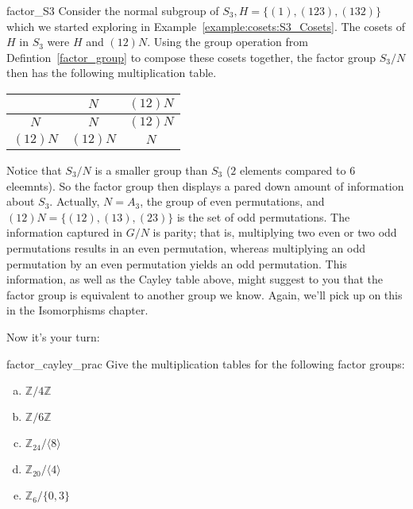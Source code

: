 { 
\begin{example}{factor_S3}
Consider the normal subgroup of $S_3, H = \{ (1), (123), (132)  \}$ which we started exploring in Example~\ref{example:cosets:S3_Cosets}.
The cosets of $H$ in $S_3$ were $H$ and $(12) N$. Using the group operation from Defintion~\ref{factor_group} to compose these cosets together, the factor group $S_3
/ N$ then has the following multiplication table.
\begin{center}
\begin{tabular}{c|cc}
         & $N$      & $(12) N$ \\
\hline
$N$      & $N$      & $(12) N$ \\
$(12) N$ & $(12) N$ & $N$
\end{tabular}
\end{center}

Notice that  $S_3 / N$ is a smaller group than $S_3$ ($2$ elements compared to $6$ eleemnts). So the factor group then displays a pared down amount of
information about $S_3$.  Actually, $N = A_3$, the group of even
permutations, and $(12) N = \{ (12), (13), (23) \}$ is the set of odd
permutations. The information captured in $G/N$ is parity; that is,
multiplying two even or two odd permutations results in an even
permutation, whereas multiplying an odd permutation by an even
permutation yields an odd permutation.  This information, as well as the Cayley table above, might suggest to you that the factor group is equivalent to another group we know.  Again, we'll pick up on this in the Isomorphisms chapter. 
\end{example}
 
 


Now it's your turn:

\begin{exercise}{factor_cayley_prac}
Give the multiplication tables for the following factor groups:

\begin{multicols}{2}
\begin{enumerate}[(a)]
\item
 ${\mathbb Z}/ 4 {\mathbb Z}$

\item
 ${\mathbb Z}/ 6 {\mathbb Z}$
\item
 ${\mathbb Z}_{24} / \langle 8 \rangle$ 

\item
 ${\mathbb Z}_{20} / \langle 4 \rangle$ 

\item
${\mathbb Z}_{6} / \{0,3\}$


\end{enumerate}
\end{multicols}
\end{exercise}}
